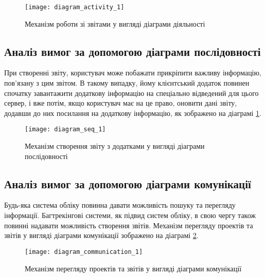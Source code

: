 \documentclass[../main.tex]{subfiles}
\begin{document}
\begin{figure}[H]
\centering
\texttt{[image: diagram\_activity\_1]}
\caption{Механізм роботи зі звітами у вигляді діаграми діяльності}
\end{figure}

\subsection{Аналіз вимог за допомогою діаграми послідовності}

При створенні звіту, користувач може побажати прикріпити важливу інформацію, пов'язану з цим звітом. В такому випадку, йому клієнтський додаток повинен спочатку завантажити додаткову інформацію на спеціально відведений для цього сервер, і вже потім, якщо користувач має на це право, оновити дані звіту, додавши до них посилання на додаткову інформацію, як зображено на діаграмі \ref{figure_diag_seq_1}.

\begin{figure}[H]
	\centering
	\texttt{[image: diagram\_seq\_1]}
	\caption{Механізм створення звіту з додатками у вигляді діаграми послідовності}
	\label{figure_diag_seq_1}
\end{figure}

\subsection{Аналіз вимог за допомогою діаграми комунікації}

Будь-яка система обліку повинна давати можливість пошуку та перегляду інформації. Багтрекінгові системи, як підвид систем обліку, в свою чергу також повинні надавати можливість створення звітів. Механізм перегляду проектів та звітів у вигляді діаграми комунікації зображено на діаграмі \ref{figure_diag_comm_1}.

\begin{figure}[H]
	\centering
	\texttt{[image: diagram\_communication\_1]}
	\caption{Механізм перегляду проектів та звітів у вигляді діаграми комунікації}
	\label{figure_diag_comm_1}
\end{figure}

\end{document}
